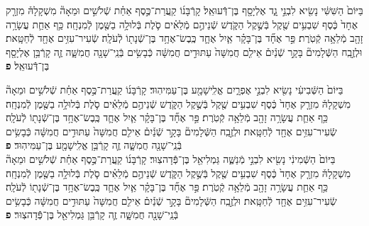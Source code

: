 \documentclass[twoside, openany, parskip=half, 11pt]{book}
\begin{document}
\begin{footnotesize}
\begin{multicols}{2}

בַּיּוֹם֙ הַשִּׁשִּׁ֔י נָשִׂ֖יא לִבְנֵ֣י גָ֑ד אֶלְיָסָ֖ף בֶּן־דְּֿֿעוּאֵֽל׃ קָרְֿבָּנ֜וֹ קַֽעֲרַת־כֶּ֣סֶף אַחַ֗ת שְֿׁלֹשִׁ֣ים וּמֵאָה֘ מִשְׁקָלָהּ֒ מִזְרָ֤ק אֶחָד֙ כֶּ֔סֶף שִׁבְעִ֥ים שֶׁ֖קֶל בְּֿשֶׁ֣קֶל הַקֹּ֑דֶשׁ שְֿׁנֵיהֶ֣ם מְֿלֵאִ֗ים סֹ֛לֶת בְּֿלוּלָ֥ה בַשֶּׁ֖מֶן לְֿמִנְחָֽה׃ כַּ֥ף אַחַ֛ת עֲשָׂרָ֥ה זָהָ֖ב מְֿלֵאָ֥ה קְֿטֹֽרֶת׃ פַּ֣ר אֶחָ֞ד בֶּן־בָּקָ֗ר אַ֧יִל אֶחָ֛ד כֶּֽבֶשׂ־אֶחָ֥ד בֶּן־שְֿׁנָת֖וֹ לְֿעֹלָֽה׃ שְֿׂעִיר־עִזִּ֥ים אֶחָ֖ד לְֿחַטָּֽאת׃ וּלְזֶ֣בַֽח הַשְּֿׁלָמִים֘ בָּקָ֣ר שְֿׁנַ֒יִם֒ אֵילִ֤ם חֲמִשָּׁה֙ עַתּוּדִ֣ים חֲמִשָּׁ֔ה כְּֿבָשִׂ֥ים בְּֿנֵֽי־שָׁנָ֖ה חֲמִשָּׁ֑ה זֶ֛ה קָרְֿבַּ֥ן אֶלְיָסָ֖ף בֶּן־דְּֿֿעוּאֵֽל׃ \textbf{פ}


בַּיּוֹם֙ הַשְּֿׁבִיעִ֔י נָשִׂ֖יא לִבְנֵ֣י אֶפְרָ֑יִם אֱלִֽישָׁמָ֖ע בֶּן־עַמִּיהֽוּד׃ קָרְֿבָּנ֜וֹ קַֽעֲרַת־כֶּ֣סֶף אַחַ֗ת שְֿׁלֹשִׁ֣ים וּמֵאָה֘ מִשְׁקָלָהּ֒ מִזְרָ֤ק אֶחָד֙ כֶּ֔סֶף שִׁבְעִ֥ים שֶׁ֖קֶל בְּֿשֶׁ֣קֶל הַקֹּ֑דֶשׁ שְֿׁנֵיהֶ֣ם מְֿלֵאִ֗ים סֹ֛לֶת בְּֿלוּלָ֥ה בַשֶּׁ֖מֶן לְֿמִנְחָֽה׃ כַּ֥ף אַחַ֛ת עֲשָׂרָ֥ה זָהָ֖ב מְֿלֵאָ֥ה קְֿטֹֽרֶת׃  פַּ֣ר אֶחָ֞ד בֶּן־בָּקָ֗ר אַ֧יִל אֶחָ֛ד כֶּֽבֶשׂ־אֶחָ֥ד בֶּן־שְֿׁנָת֖וֹ לְֿעֹלָֽה׃ שְֿׂעִיר־עִזִּ֥ים אֶחָ֖ד לְֿחַטָּֽאת׃ וּלְזֶ֣בַֽח הַשְּֿׁלָמִים֘ בָּקָ֣ר שְֿׁנַ֒יִם֒ אֵילִ֤ם חֲמִשָּׁה֙ עַתּוּדִ֣ים חֲמִשָּׁ֔ה כְּֿבָשִׂ֥ים בְּֿנֵֽי־שָׁנָ֖ה חֲמִשָּׁ֑ה זֶ֛ה קָרְֿבַּ֥ן אֱלִֽישָׁמָ֖ע בֶּן־עַמִּיהֽוּד׃ \textbf{פ}
 \\
 בַּיּוֹם֙ הַשְּֿׁמִינִ֔י נָשִׂ֖יא לִבְנֵ֣י מְֿנַשֶּׁ֑ה גַּמְלִיאֵ֖ל בֶּן־פְּֿֿדָהצֽוּר׃ קָרְֿבָּנ֜וֹ קַֽעֲרַת־כֶּ֣סֶף אַחַ֗ת שְֿׁלֹשִׁ֣ים וּמֵאָה֘ מִשְׁקָלָהּ֒ מִזְרָ֤ק אֶחָד֙ כֶּ֔סֶף שִׁבְעִ֥ים שֶׁ֖קֶל בְּֿשֶׁ֣קֶל הַקֹּ֑דֶשׁ שְֿׁנֵיהֶ֣ם מְֿלֵאִ֗ים סֹ֛לֶת בְּֿלוּלָ֥ה בַשֶּׁ֖מֶן לְֿמִנְחָֽה׃ כַּ֥ף אַחַ֛ת עֲשָׂרָ֥ה זָהָ֖ב מְֿלֵאָ֥ה קְֿטֹֽרֶת׃ פַּ֣ר אֶחָ֞ד בֶּן־בָּקָ֗ר אַ֧יִל אֶחָ֛ד כֶּֽבֶשׂ־אֶחָ֥ד בֶּן־שְֿׁנָת֖וֹ לְֿעֹלָֽה׃ שְֿׂעִיר־עִזִּ֥ים אֶחָ֖ד לְֿחַטָּֽאת׃ וּלְזֶ֣בַֽח הַשְּֿׁלָמִים֘ בָּקָ֣ר שְֿׁנַ֒יִם֒ אֵילִ֤ם חֲמִשָּׁה֙ עַתּוּדִ֣ים חֲמִשָּׁ֔ה כְּֿבָשִׂ֥ים בְּֿנֵֽי־שָׁנָ֖ה חֲמִשָּׁ֑ה זֶ֛ה קָרְֿבַּ֥ן גַּמְלִיאֵ֖ל בֶּן־פְּֿֿדָהצֽוּר׃ \textbf{פ}



\end{multicols}
\end{footnotesize}
\end{document}
